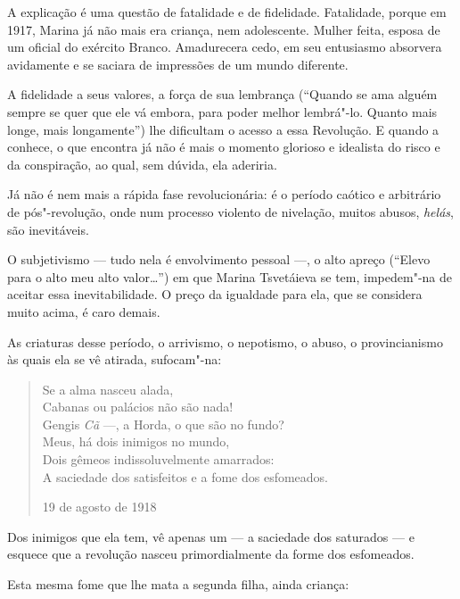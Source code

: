 A explicação é uma questão de fatalidade e de fidelidade. Fatalidade,
porque em 1917, Marina já não mais era criança, nem adolescente. Mulher
feita, esposa de um oficial do exército Branco. Amadurecera cedo, em seu
entusiasmo absorvera avidamente e se saciara de impressões de um mundo
diferente.

A fidelidade a seus valores, a força de sua lembrança (``Quando se ama
alguém sempre se quer que ele vá embora, para poder melhor lembrá"-lo.
Quanto mais longe, mais longamente'') lhe dificultam o acesso a essa
Revolução. E quando a conhece, o que encontra já não é mais o momento
glorioso e idealista do risco e da conspiração, ao qual, sem dúvida, ela
aderiria.

Já não é nem mais a rápida fase revolucionária: é o período caótico e
arbitrário de pós"-revolução, onde num processo violento de nivelação,
muitos abusos, \emph{helás}, são inevitáveis.

O subjetivismo --- tudo nela é envolvimento pessoal ---, o alto apreço
(``Elevo para o alto meu alto valor\ldots{}'') em que Marina Tsvetáieva se
tem, impedem"-na de aceitar essa inevitabilidade. O preço da igualdade
para ela, que se considera muito acima, é caro demais.

As criaturas desse período, o arrivismo, o nepotismo, o abuso, o
provincianismo às quais ela se vê atirada, sufocam"-na:

\begin{verse}
Se a alma nasceu alada, \\
Cabanas ou palácios não são nada! \\
Gengis \emph{Cã} ---, a Horda, o que são no fundo? \\[8pt]
Meus, há dois inimigos no mundo, \\
Dois gêmeos indissoluvelmente amarrados: \\
A saciedade dos satisfeitos e a fome \qb{}dos esfomeados. 

19 de agosto de 1918

\end{verse}

Dos inimigos que ela tem, vê apenas um --- a saciedade dos saturados --- e
esquece que a revolução nasceu primordialmente da forme dos esfomeados.

Esta mesma fome que lhe mata a segunda filha, ainda criança:


